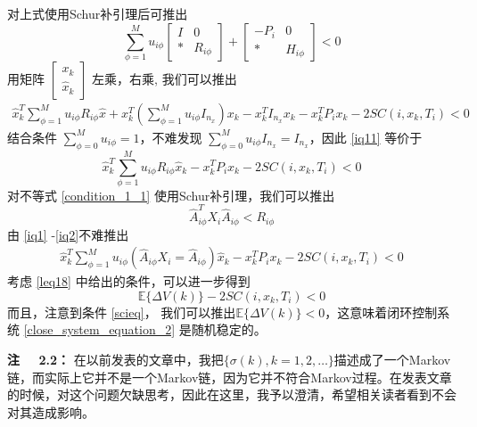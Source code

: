	对上式使用Schur补引理后可推出
	\begin{equation} \label{cons}
	\sum_{\phi=1}^{M}u_{i\phi} \begin{bmatrix}
	I&0\\
	*&R_{i\phi}
	\end{bmatrix} + \begin{bmatrix}
	-P_{i }&0\\
	*&H_{i\phi}
	\end{bmatrix} <0
	\end{equation}
	用矩阵 $\begin{bmatrix}
	x_k\\
	\hat{x}_{k}
	\end{bmatrix}$ 左乘，右乘, 我们可以推出
	\begin{equation} \label{iq11}
	\begin{split}
	\hat{x}^{T}_{k}\sum_{\phi=1}^{M}u_{i\phi}R_{i\phi}\hat{x}+x^{T}_{k}(\sum_{\phi=1}^{M}u_{i\phi}I_{n_x})x_{k}-x^{T}_{k}I_{n_x}x_{k} -x^{T}_{k}P_{i}x_{k}-2SC(i,x_k,T_i)<0
	\end{split}
	\end{equation}
	结合条件 $\sum_{\phi=0}^{M}u_{i\phi}=1$，不难发现 $\sum_{\phi=0}^{M}u_{i\phi}I_{n_x}=I_{n_x}$，因此 \eqref{iq11} 等价于
	\begin{equation} \label{iq1}
	\hat{x}^{T}_{k}\sum_{\phi=1}^{M}u_{i\phi}R_{i\phi}\hat{x}_k-x^{T}_{k}P_{i}x_{k}-2SC(i,x_k,T_i)<0
	\end{equation}
	对不等式 \eqref{condition_1_1} 使用Schur补引理，我们可以推出
	\begin{equation} \label{iq2}
	\hat{A}^{T}_{i\phi}X_{i}\hat{A}_{i\phi}<R_{i\phi}
	\end{equation}
	由 \eqref{iq1} -\eqref{iq2}不难推出
	\begin{equation} \label{leq22}
	\begin{split}
	\hat{x}^{T}_{k}\sum_{\phi=1}^{M} u_{i\phi}(\hat{A}_{i\phi}X_{i}=\hat{A}_{i\phi}) \hat{x}_{k} - x^{T}_{k}P_{i}x_{k} -2SC(i,x_k,T_i)<0
	\end{split}
	\end{equation}
	考虑 \eqref{leq18} 中给出的条件，可以进一步得到
	\begin{equation}
	\mathbb{E}\{\varDelta V(k)\}-2SC(i,x_k,T_i)<0
	\end{equation}
	而且，注意到条件 \eqref{scieq}， 我们可以推出$\mathbb{E}\{\varDelta V(k)\} <0$，这意味着闭环控制系统  \eqref{close_system_equation_2} 是随机稳定的。
	
	{\bf 注 \ \ 2.2：} 
	在以前发表的文章中，我把$\{\sigma(k), k=1,2,\dots\}$描述成了一个Markov链，而实际上它并不是一个Markov链，因为它并不符合Markov过程。在发表文章的时候，对这个问题欠缺思考，因此在这里，我予以澄清，希望相关读者看到不会对其造成影响。 
	
